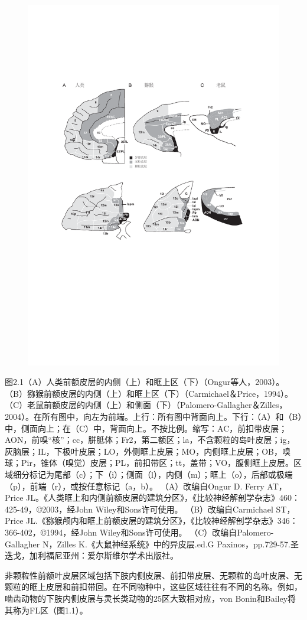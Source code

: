 \begin{figure}
	\centering
	\includegraphics[width=0.7\linewidth]{image_pfc/Fig_2_1}
\end{figure}

图2.1（A）人类前额皮层的内侧（上）和眶上区（下）（Ongur等人，2003）。 （B）猕猴前额皮层的内侧（上）和眶上区（下）（Carmichael＆Price，1994）。 （C）老鼠前额皮层的内侧（上）和侧面（下）（Palomero-Gallagher＆Zilles，2004）。在所有图中，向左为前端。上行：所有图中背面向上。下行：（A）和（B）中，侧面向上；在（C）中，背面向上。不按比例。缩写：AC，前扣带皮层；AON，前嗅“核”；cc，胼胝体；Fr2，第二额区；la，不含颗粒的岛叶皮层；ig，灰脑层；IL，下极叶皮层；LO，外侧眶上皮层；MO，内侧眶上皮层；OB，嗅球；Pir，锥体（嗅觉）皮层；PL，前扣带区；tt，盖带；VO，腹侧眶上皮层。区域细分标记为尾部（c）；下（i）；侧面（l），内侧（m）；眶上（o），后部或极端（p），前端（r），或按任意标记（a，b）。 （A）改编自Ongur D. Ferry AT，Price JL。《人类眶上和内侧前额皮层的建筑分区》，《比较神经解剖学杂志》460：425-49，©2003，经John Wiley和Sons许可使用。 （B）改编自Carmichael ST，Price JL.《猕猴颅内和眶上前额皮层的建筑分区》，《比较神经解剖学杂志》346：366-402，©1994，经John Wiley和Sons许可使用。 （C）改编自Palomero-Gallagher N，Zilles K.《大鼠神经系统》中的异皮层.ed.G Paxinos，pp.729-57.圣迭戈，加利福尼亚州：爱尔斯维尔学术出版社。

非颗粒性前额叶皮层区域包括下肢内侧皮层、前扣带皮层、无颗粒的岛叶皮层、无颗粒的眶上皮层和前扣带回。在不同物种中，这些区域往往有不同的名称。例如，啮齿动物的下肢内侧皮层与灵长类动物的25区大致相对应，von Bonin和Bailey将其称为FL区（图1.1）。

